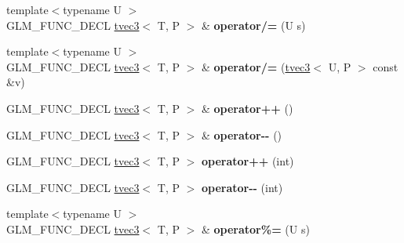 \begin{DoxyCompactItemize}
\item 
\hypertarget{structglm_1_1detail_1_1tvec3_ab0e67902096b95132ded9191df59f483}{{\footnotesize template$<$typename U $>$ }\\G\-L\-M\-\_\-\-F\-U\-N\-C\-\_\-\-D\-E\-C\-L \hyperlink{structglm_1_1detail_1_1tvec3}{tvec3}$<$ T, P $>$ \& {\bfseries operator/=} (U s)}\label{structglm_1_1detail_1_1tvec3_ab0e67902096b95132ded9191df59f483}

\item 
\hypertarget{structglm_1_1detail_1_1tvec3_af5f48f8e468b7941eff35170d5e10cab}{{\footnotesize template$<$typename U $>$ }\\G\-L\-M\-\_\-\-F\-U\-N\-C\-\_\-\-D\-E\-C\-L \hyperlink{structglm_1_1detail_1_1tvec3}{tvec3}$<$ T, P $>$ \& {\bfseries operator/=} (\hyperlink{structglm_1_1detail_1_1tvec3}{tvec3}$<$ U, P $>$ const \&v)}\label{structglm_1_1detail_1_1tvec3_af5f48f8e468b7941eff35170d5e10cab}

\item 
\hypertarget{structglm_1_1detail_1_1tvec3_a01056db42bfb77a320bf3516ea4951b4}{G\-L\-M\-\_\-\-F\-U\-N\-C\-\_\-\-D\-E\-C\-L \hyperlink{structglm_1_1detail_1_1tvec3}{tvec3}$<$ T, P $>$ \& {\bfseries operator++} ()}\label{structglm_1_1detail_1_1tvec3_a01056db42bfb77a320bf3516ea4951b4}

\item 
\hypertarget{structglm_1_1detail_1_1tvec3_aaafe373e142ed03ab8e8d550cd660353}{G\-L\-M\-\_\-\-F\-U\-N\-C\-\_\-\-D\-E\-C\-L \hyperlink{structglm_1_1detail_1_1tvec3}{tvec3}$<$ T, P $>$ \& {\bfseries operator-\/-\/} ()}\label{structglm_1_1detail_1_1tvec3_aaafe373e142ed03ab8e8d550cd660353}

\item 
\hypertarget{structglm_1_1detail_1_1tvec3_a4cce0be26db53a9360fbfbe700c5b746}{G\-L\-M\-\_\-\-F\-U\-N\-C\-\_\-\-D\-E\-C\-L \hyperlink{structglm_1_1detail_1_1tvec3}{tvec3}$<$ T, P $>$ {\bfseries operator++} (int)}\label{structglm_1_1detail_1_1tvec3_a4cce0be26db53a9360fbfbe700c5b746}

\item 
\hypertarget{structglm_1_1detail_1_1tvec3_a3e9d395ca33b49731052df266e08433b}{G\-L\-M\-\_\-\-F\-U\-N\-C\-\_\-\-D\-E\-C\-L \hyperlink{structglm_1_1detail_1_1tvec3}{tvec3}$<$ T, P $>$ {\bfseries operator-\/-\/} (int)}\label{structglm_1_1detail_1_1tvec3_a3e9d395ca33b49731052df266e08433b}

\item 
\hypertarget{structglm_1_1detail_1_1tvec3_a96e6e5efb8b0d0f589345e6d5180e013}{{\footnotesize template$<$typename U $>$ }\\G\-L\-M\-\_\-\-F\-U\-N\-C\-\_\-\-D\-E\-C\-L \hyperlink{structglm_1_1detail_1_1tvec3}{tvec3}$<$ T, P $>$ \& {\bfseries operator\%=} (U s)}\label{structglm_1_1detail_1_1tvec3_a96e6e5efb8b0d0f589345e6d5180e013}


\end{DoxyCompactItemize}
